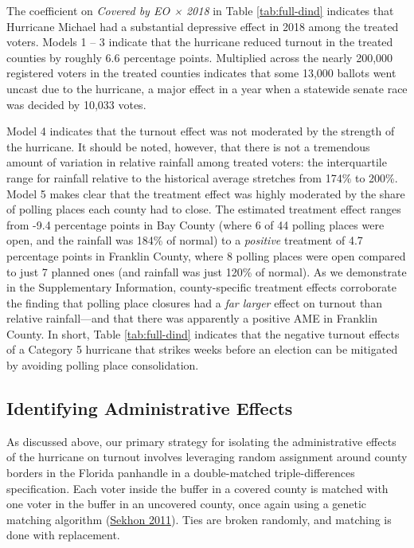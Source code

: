 \documentclass[
  12pt,
]{article}
\begin{document}
\begin{singlespace}

\end{singlespace}

The coefficient on \emph{Covered by EO × 2018} in Table \ref{tab:full-dind} indicates that Hurricane Michael had a substantial depressive effect in 2018 among the treated voters. Models 1 -- 3 indicate that the hurricane reduced turnout in the treated counties by roughly 6.6 percentage points. Multiplied across the nearly 200,000 registered voters in the treated counties indicates that some 13,000 ballots went uncast due to the hurricane, a major effect in a year when a statewide senate race was decided by 10,033 votes.

Model 4 indicates that the turnout effect was not moderated by the strength of the hurricane. It should be noted, however, that there is not a tremendous amount of variation in relative rainfall among treated voters: the interquartile range for rainfall relative to the historical average stretches from 174\% to 200\%. Model 5 makes clear that the treatment effect was highly moderated by the share of polling places each county had to close. The estimated treatment effect ranges from -9.4 percentage points in Bay County (where 6 of 44 polling places were open, and the rainfall was 184\% of normal) to a \emph{positive} treatment of 4.7 percentage points in Franklin County, where 8 polling places were open compared to just 7 planned ones (and rainfall was just 120\% of normal). As we demonstrate in the Supplementary Information, county-specific treatment effects corroborate the finding that polling place closures had a \emph{far larger} effect on turnout than relative rainfall---and that there was apparently a positive AME in Franklin County. In short, Table \ref{tab:full-dind} indicates that the negative turnout effects of a Category 5 hurricane that strikes weeks before an election can be mitigated by avoiding polling place consolidation.

\hypertarget{identifying-administrative-effects}{%
\subsection*{Identifying Administrative Effects}\label{identifying-administrative-effects}}

As discussed above, our primary strategy for isolating the administrative effects of the hurricane on turnout involves leveraging random assignment around county borders in the Florida panhandle in a double-matched triple-differences specification. Each voter inside the buffer in a covered county is matched with one voter in the buffer in an uncovered county, once again using a genetic matching algorithm (\protect\hyperlink{ref-Sekhon2011}{Sekhon 2011}). Ties are broken randomly, and matching is done with replacement.
\end{document}
